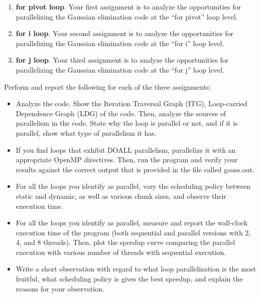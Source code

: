 \begin{enumerate}
\item {\bf for pivot loop}. Your first assignment is to analyze the opportunities for 
parallelizing the Gaussian elimination code at the ``for pivot'' loop level.  
\item {\bf for i loop}. Your second assignment is to analyze the opportunities for 
parallelizing the Gaussian elimination code at the ``for i'' loop level.  
\item {\bf for j loop}. Your third assignment is to analyze the opportunities for 
parallelizing the Gaussian elimination code at the ``for j'' loop level.  
\end{enumerate}

Perform and report the following for each of the three assignments:

\begin{itemize}
  \item Analyze the code. Show the Iteration Traversal Graph (ITG), 
Loop-carried Dependence Graph (LDG) of the code. Then, analyze
the sources of parallelism in the code. State why the loop is parallel or not, and
if it is parallel, show what type of parallelism it has. 
  \item If you find loops that exhibit DOALL parallelism, parallelize it with an appropriate
OpenMP directives. Then, run the program and verify your results against 
the correct output that is provided in the file called gauss.out. 
  \item For all the loops you identify as parallel, vary the scheduling policy between static 
and dynamic, as well as various chunk sizes, and observe their execution time.  
  \item For all the loops you identify as parallel, measure and report the wall-clock execution 
time of the program (both sequential and parallel versions with 2, 4, and 8 threads). 
Then, plot the speedup curve comparing the parallel execution with various number of 
threads with sequential execution. 
  \item Write a short observation with regard to what loop parallelization is the most 
fruitful, what scheduling policy is gives the best speedup, and explain the reasons for
your observation. 
\end{itemize}




